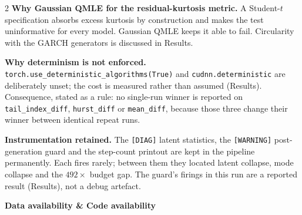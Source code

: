 \documentclass[10pt]{article}
\begin{document}
\begin{multicols}{2}
\smallskip
\textbf{Why Gaussian QMLE for the residual-kurtosis metric.}
A Student-$t$ specification absorbs excess kurtosis by construction and makes the test uninformative for every model. Gaussian QMLE keeps it able to fail. Circularity with the GARCH generators is discussed in Results.

\smallskip
\textbf{Why determinism is not enforced.}
\texttt{torch.use\_deterministic\_algorithms(True)} and \texttt{cudnn.deterministic} are deliberately unset; the cost is measured rather than assumed (Results). Consequence, stated as a rule: no single-run winner is reported on \texttt{tail\_index\_diff}, \texttt{hurst\_diff} or \texttt{mean\_diff}, because those three change their winner between identical repeat runs.

\smallskip
\textbf{Instrumentation retained.}
The \texttt{[DIAG]} latent statistics, the \texttt{[WARNING]} post-generation guard and the step-count printout are kept in the pipeline permanently. Each fires rarely; between them they located latent collapse, mode collapse and the $492\times$ budget gap. The guard's firings in this run are a reported result (Results), not a debug artefact.


\end{multicols}

\clearpage

\begin{tcolorbox}[
  colback=NavyBg, colframe=NavyBg!60!black, arc=4pt,
  left=8pt, right=8pt, top=4pt, bottom=4pt,
  before skip=0pt, after skip=10pt]
{\large\bfseries\color{Navy} Data availability \& Code availability}
\end{tcolorbox}
\end{document}
